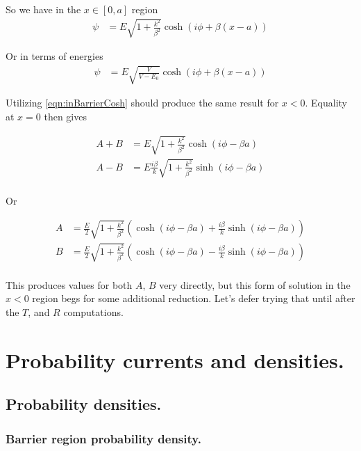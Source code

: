 \documentclass{article}
\begin{document}
So we have in the $x \in [0,a]$ region
\begin{align}\label{eqn:inBarrierCosh}
\psi &= E \sqrt{1 + \frac{k^2}{\beta^2}} \cosh\left( i\phi + \beta(x-a) \right) 
\end{align}

Or in terms of energies
\begin{align}
\psi &= E 
\sqrt{\frac{V}{V-E_0}}
\cosh\left( i\phi + \beta(x-a) \right) 
\end{align}

Utilizing 
\ref{eqn:inBarrierCosh}
should produce the same result for $x<0$.  Equality at $x=0$ then gives

\begin{align*}
A + B &= E \sqrt{1 + \frac{k^2}{\beta^2}} \cosh\left( i\phi -\beta a \right) \\
A - B &= E \frac{i\beta}{k} \sqrt{1 + \frac{k^2}{\beta^2}} \sinh\left( i\phi -\beta a \right) \\
\end{align*}

Or

\begin{align*}
A &= \frac{E}{2} \sqrt{1 + \frac{k^2}{\beta^2}} \left(
\cosh\left( i\phi -\beta a \right) + \frac{i\beta}{k} \sinh\left( i\phi -\beta a \right) 
\right) \\
B &= \frac{E}{2} \sqrt{1 + \frac{k^2}{\beta^2}} \left(
\cosh\left( i\phi -\beta a \right) - \frac{i\beta}{k} \sinh\left( i\phi -\beta a \right) 
\right) \\
\end{align*}

This produces values for both $A$, $B$ very directly, but this 
form of solution in the $x<0$ region begs for some additional reduction.  Let's
defer trying that until after the $T$, and $R$ computations.

\section{ Probability currents and densities. }

\subsection{ Probability densities. }

\subsubsection{ Barrier region probability density. }
\end{document}
